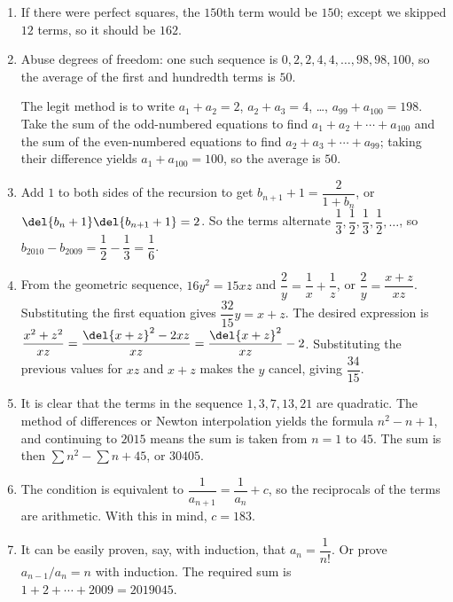 \documentclass[10pt,paper=letter]{scrartcl}
\begin{document}
\begin{enumerate}

\item If there were perfect squares, the $150$th term would be $150$; except we skipped $12$ terms, so it should be $162$. 

\item Abuse degrees of freedom: one such sequence is $0, 2, 2, 4, 4, \ldots, 98, 98, 100$, so the average of the first and hundredth terms is $50$.

The legit method is to write $a_1 + a_2 = 2$, $a_2 + a_3 = 4$, \dots, $a_{99} + a_{100} = 198$. Take the sum of the odd-numbered equations to find $a_1 + a_2 + \cdots + a_{100}$ and the sum of the even-numbered equations to find $a_2 + a_3 + \cdots + a_{99}$; taking their difference yields $a_1 + a_{100} = 100$, so the average is $50$.

\item Add $1$ to both sides of the recursion to get $b_{n+1} + 1 = \dfrac2{1 + b_n}$, or $\del{b_n + 1}\del{b_{n+1} + 1} = 2$. So the terms alternate $\dfrac13, \dfrac12, \dfrac13, \dfrac12, \ldots$, so $b_{2010} - b_{2009} = \dfrac12 - \dfrac13 = \dfrac16$.

\item From the geometric sequence, $16y^2 = 15xz$ and $\dfrac2y = \dfrac1x + \dfrac1z$, or $\dfrac2y = \dfrac{x+z}{xz}$. Substituting the first equation gives $\dfrac{32}{15}y = x+z$. The desired expression is $\dfrac{x^2 + z^2}{xz} = \dfrac{\del{x+z}^2 - 2xz}{xz} = \dfrac{\del{x+z}^2}{xz} - 2$. Substituting the previous values for $xz$ and $x+z$ makes the $y$ cancel, giving $\dfrac{34}{15}$.

\item It is clear that the terms in the sequence $1, 3, 7, 13, 21$ are quadratic. The method of differences or Newton interpolation yields the formula $n^2 - n + 1$, and continuing to $2015$ means the sum is taken from $n = 1$ to $45$. The sum is then $\sum n^2 - \sum n + 45$, or $30405$.

\item The condition is equivalent to $\dfrac1{a_{n+1}} = \dfrac1{a_n} + c$, so the reciprocals of the terms are arithmetic. With this in mind, $c = 183$.

\item It can be easily proven, say, with induction, that $a_n = \dfrac1{n!}$. Or prove $a_{n-1}/a_n = n$ with induction. The required sum is $1 + 2 + \cdots + 2009 = 2019045$.

\end{enumerate}
\end{document}
